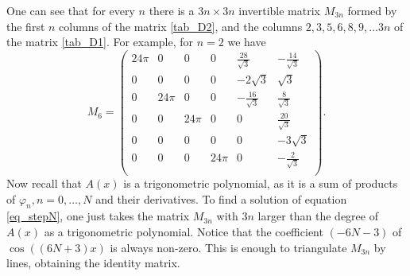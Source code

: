\documentclass{amsart}
\begin{document}

One can see that for every $n$ there is a $3n \times 3n$ invertible matrix $M_{3n}$ formed by the first $n$ columns of the matrix \eqref{tab_D2}, and the columns $2, 3, 5,6, 8,9, \ldots 3n$ of the matrix \eqref{tab_D1}.
For example, for $n=2$ we have
\begin{equation}
	M_6 = \label{tab_D12}
	\left(
\begin{array}{cccccc}
 24 \pi & 0 & 0 & 0 & \frac{28}{\sqrt{3}} & -\frac{14}{\sqrt{3}} \\
 0 & 0 & 0 & 0 & -2 \sqrt{3} & \sqrt{3} \\
 0 & 24 \pi & 0 & 0 & -\frac{16}{\sqrt{3}} & \frac{8}{\sqrt{3}} \\
 0 & 0 & 24 \pi & 0 & 0 & \frac{20}{\sqrt{3}} \\
 0 & 0 & 0 & 0 & 0 & -3 \sqrt{3} \\
 0 & 0 & 0 & 24 \pi & 0 & -\frac{2}{\sqrt{3}} \\
\end{array}
\right).
\end{equation}
Now recall that $A(x)$ is a trigonometric polynomial, as it is a sum of products of $\varphi_n, n=0, \ldots, N$ and their derivatives.
To find a solution of equation \eqref{eq_stepN}, one just takes the matrix $M_{3n}$ with $3n$ larger than the degree of $A(x)$ as a trigonometric polynomial.
Notice that the coefficient $(-6N-3)$ of $\cos((6N+3) x)$ is always non-zero. This is enough to triangulate $M_{3n}$ by lines, obtaining the identity matrix. 
\end{document}
